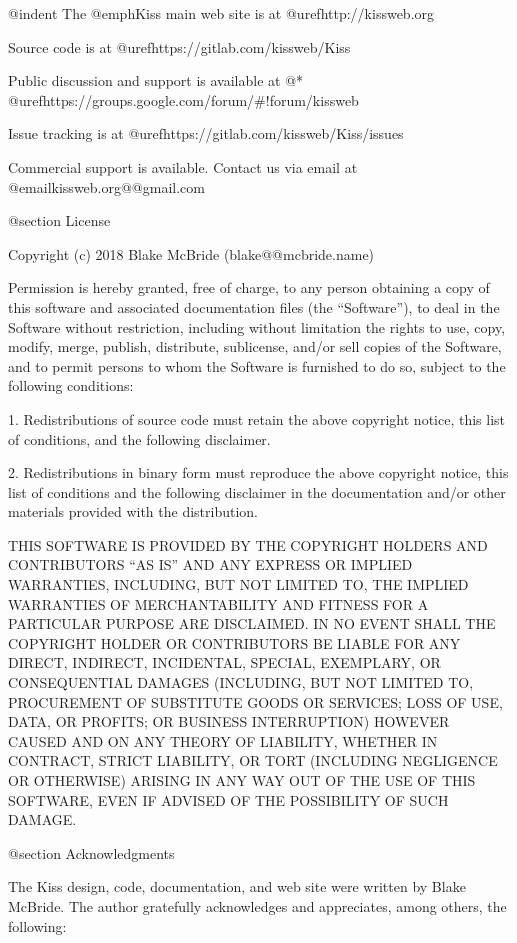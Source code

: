 @indent
The @emph{Kiss} main web site is at @uref{http://kissweb.org}

Source code is at @uref{https://gitlab.com/kissweb/Kiss}

Public discussion and support is available at @* @uref{https://groups.google.com/forum/#!forum/kissweb}

Issue tracking is at @uref{https://gitlab.com/kissweb/Kiss/issues}

Commercial support is available.  Contact us via email at @email{kissweb.org@@gmail.com}

@section License

Copyright (c) 2018 Blake McBride (blake@@mcbride.name)

Permission is hereby granted, free of charge, to any person obtaining
a copy of this software and associated documentation files (the
``Software''), to deal in the Software without restriction, including
without limitation the rights to use, copy, modify, merge, publish,
distribute, sublicense, and/or sell copies of the Software, and to
permit persons to whom the Software is furnished to do so, subject to
the following conditions:

1. Redistributions of source code must retain the above copyright
notice, this list of conditions, and the following disclaimer.

2. Redistributions in binary form must reproduce the above copyright
notice, this list of conditions and the following disclaimer in the
documentation and/or other materials provided with the distribution.

THIS SOFTWARE IS PROVIDED BY THE COPYRIGHT HOLDERS AND CONTRIBUTORS
``AS IS'' AND ANY EXPRESS OR IMPLIED WARRANTIES, INCLUDING, BUT NOT
LIMITED TO, THE IMPLIED WARRANTIES OF MERCHANTABILITY AND FITNESS FOR
A PARTICULAR PURPOSE ARE DISCLAIMED. IN NO EVENT SHALL THE COPYRIGHT
HOLDER OR CONTRIBUTORS BE LIABLE FOR ANY DIRECT, INDIRECT, INCIDENTAL,
SPECIAL, EXEMPLARY, OR CONSEQUENTIAL DAMAGES (INCLUDING, BUT NOT
LIMITED TO, PROCUREMENT OF SUBSTITUTE GOODS OR SERVICES; LOSS OF USE,
DATA, OR PROFITS; OR BUSINESS INTERRUPTION) HOWEVER CAUSED AND ON ANY
THEORY OF LIABILITY, WHETHER IN CONTRACT, STRICT LIABILITY, OR TORT
(INCLUDING NEGLIGENCE OR OTHERWISE) ARISING IN ANY WAY OUT OF THE USE
OF THIS SOFTWARE, EVEN IF ADVISED OF THE POSSIBILITY OF SUCH DAMAGE.

@section Acknowledgments

The Kiss design, code, documentation, and web site were written by Blake
McBride.  The author gratefully acknowledges and appreciates, among others, the following:


